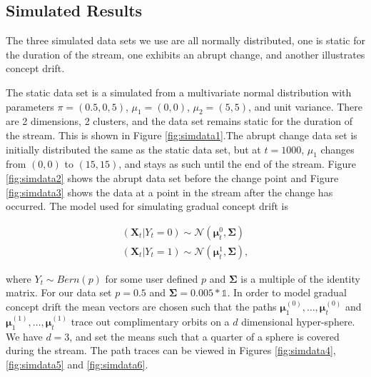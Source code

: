 \subsection{Simulated Results}

The three simulated data sets we use are all normally distributed, one is static for the duration of the stream, one exhibits an abrupt change, and another  illustrates concept drift. 

The static data set is a simulated from a multivariate normal distribution with parameters $\pi = (0.5, 0,5)$, $\mu_1 = (0,0)$, $\mu_2 = (5,5)$, and unit variance. There are 2 dimensions, 2 clusters, and the data set remains static for the duration of the stream.  This is shown in Figure \ref{fig:simdata1}.The abrupt change data set is initially distributed the same as the static data set, but at $t = 1000$, $\mu_1$ changes from $(0,0)$ to $(15,15)$, and stays as such until the end of the stream. Figure \ref{fig:simdata2} shows the abrupt data set before the change point and Figure \ref{fig:simdata3} shows the data at a point in the stream after the change has occurred.  
The model used for simulating gradual concept drift is

\begin{align}
  (\boldsymbol{X}_t | Y_t = 0) \sim \mathcal{N}(\boldsymbol{\mu}_t^0, \boldsymbol{\Sigma})\\
  (\boldsymbol{X}_t | Y_t = 1) \sim \mathcal{N}(\boldsymbol{\mu}_t^1, \boldsymbol{\Sigma}),
 \end{align}

where $Y_t \sim Bern(p)$ for some user defined $p$ and $\boldsymbol{\Sigma}$ is a multiple of the identity matrix. For our data set  $p = 0.5$ and $\boldsymbol{\Sigma} = 0.005* \mathds{1}.$ In order to model gradual concept drift the mean vectors are chosen such that the paths $\boldsymbol{\mu}_1^{(0)}, \hdots, \boldsymbol{\mu}_t^{(0)}$ and  $\boldsymbol{\mu}_1^{(1)}, \hdots, \boldsymbol{\mu}_t^{(1)}$ trace out complimentary orbits on a $d$ dimensional hyper-sphere. We have $d = 3$, and set the means such that a quarter of a sphere is covered during the stream. The path traces can be viewed in Figures \ref{fig:simdata4}, \ref{fig:simdata5} and \ref{fig:simdata6}.

